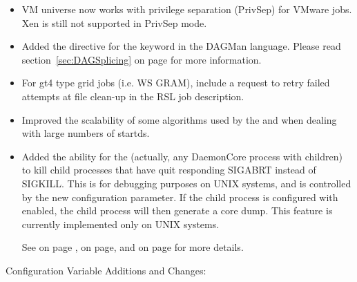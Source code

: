 \begin{itemize}
\item VM universe now works with privilege separation (PrivSep)
for VMware jobs. Xen is still not supported in PrivSep mode.

\item Added the  directive for the  keyword in
the DAGMan language.
Please read section~\ref{sec:DAGSplicing} on page \pageref{sec:DAGSplicing} for
more information.

\item For gt4 type grid jobs (i.e. WS GRAM), include a request to retry
failed attempts at file clean-up in the RSL job description.

\item Improved the scalability of some algorithms used by the
 and  when dealing with large
numbers of startds.

\item Added the ability for the  (actually, any
  DaemonCore process with children) to kill child
  processes that have quit responding SIGABRT instead of SIGKILL.
  This is for debugging purposes on UNIX systems, and is controlled by
  the new  configuration
  parameter.  If the child process is configured with
   enabled, the child process will then
  generate a core dump.
  This feature is currently implemented only on UNIX systems.

  See
  on page \pageref{param:NotRespondingWantCore},
  on page\pageref{param:NotRespondingTimeout},
  and
  on page \pageref{param:CreateCoreFiles}
  for more details.


\end{itemize}

\noindent Configuration Variable Additions and Changes:

